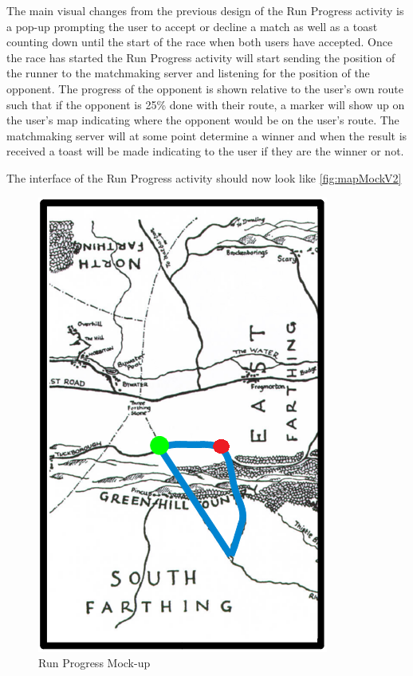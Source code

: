 The main visual changes from the previous design of the Run Progress activity is a pop-up prompting the user to accept or decline a match as well as a toast counting down until the start of the race when both users have accepted. Once the race has started the Run Progress activity will start sending the position of the runner to the matchmaking server and listening for the position of the opponent. The progress of the opponent is shown relative to the user's own route such that if the opponent is 25\% done with their route, a marker will show up on the user's map indicating where the opponent would be on the user's route. The matchmaking server will at some point determine a winner and when the result is received a toast will be made indicating to the user if they are the winner or not.

The interface of the Run Progress activity should now look like \autoref{fig:mapMockV2}

\begin{figure}[ht]
\begin{center}
 \caption{Run Progress Mock-up}
 \label{fig:mapMockV2}
 \includegraphics[scale=0.4]{img/mapMockV2.png}
\end{center}
\end{figure}

